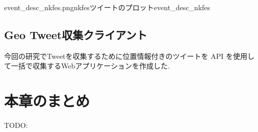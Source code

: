 {event_desc_nkfes.png}{nkfesツイートのプロット}{event_desc_nkfes}

\subsection{Geo Tweet収集クライアント}
今回の研究でTweetを収集するために位置情報付きのツイートを API を使用して一括で収集するWebアプリケーションを作成した.


\newpage

\section{本章のまとめ}
TODO:




\newpage
